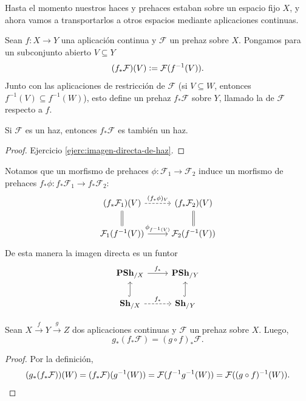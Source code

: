 \documentclass{article}
\numberwithin{equation}{section}
\theoremstyle{definition}
\begin{document}

Hasta el momento nuestros haces y prehaces estaban sobre un espacio fijo $X$,
y ahora vamos a transportarlos a otros espacios mediante aplicaciones continuas.

\begin{definicion}
  \label{dfn:imagen-directa}
  Sean $f\colon X\to Y$ una aplicación continua y $\mathcal{F}$ un prehaz sobre
  $X$. Pongamos para un subconjunto abierto $V \subseteq Y$
  $$(f_* \mathcal{F}) (V) \mathrel{\mathop:}= \mathcal{F} (f^{-1} (V)).$$
  Junto con las aplicaciones de restricción de $\mathcal{F}$
  (si $V \subseteq W$, entonces $f^{-1} (V) \subseteq f^{-1} (W)$), esto define
  un prehaz $f_* \mathcal{F}$ sobre $Y$, llamado la 
  de $\mathcal{F}$ respecto a $f$.
\end{definicion}

\begin{observacion}
  Si $\mathcal{F}$ es un haz, entonces $f_* \mathcal{F}$ es también un haz.

  \begin{proof}
    Ejercicio \ref{ejerc:imagen-directa-de-haz}.
  \end{proof}
\end{observacion}

Notamos que un morfismo de prehaces $\phi\colon \mathcal{F}_1 \to \mathcal{F}_2$
induce un morfismo de prehaces
$f_*\phi\colon f_*\mathcal{F}_1 \to f_*\mathcal{F}_2$:
\[ \begin{tikzcd}
    (f_*\mathcal{F}_1) (V) \ar[dashed]{r}{(f_*\phi)_V}\ar[equals]{d} & (f_*\mathcal{F}_2) (V)\ar[equals]{d} \\
    \mathcal{F}_1 (f^{-1} (V)) \ar{r}{\phi_{f^{-1} (V)}} & \mathcal{F}_2 (f^{-1} (V))
  \end{tikzcd} \]
De esta manera la imagen directa es un funtor
\[ \begin{tikzcd}
    \categ{PSh}_{/X} \ar{r}{f_*} & \categ{PSh}_{/Y}\\
    \categ{Sh}_{/X} \ar[dashed]{r}{f_*}\ar[hookrightarrow]{u} & \categ{Sh}_{/Y}\ar[hookrightarrow]{u}
  \end{tikzcd} \]

\begin{observacion}
  Sean $X \xrightarrow{f} Y \xrightarrow{g} Z$ dos aplicaciones continuas y
  $\mathcal{F}$ un prehaz sobre $X$. Luego,
  $$g_* (f_* \mathcal{F}) = (g\circ f)_* \mathcal{F}.$$

  \begin{proof}
    Por la definición,
    \[ (g_* (f_* \mathcal{F})) (W) =
       (f_* \mathcal{F}) (g^{-1} (W)) =
       \mathcal{F} (f^{-1} g^{-1} (W)) =
       \mathcal{F} ((g\circ f)^{-1} (W)). \qedhere \]
  \end{proof}
\end{observacion}
\end{document}
